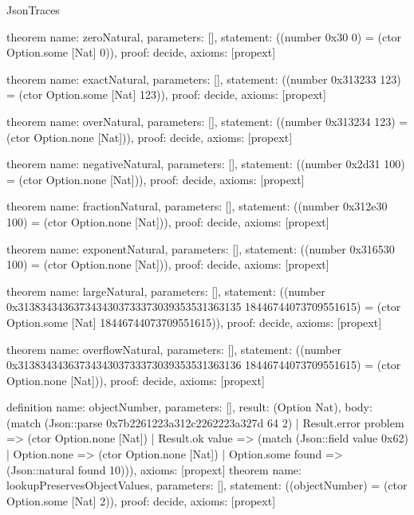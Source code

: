 \begin{lexlean}{JsonTraces}
\begin{semanticmodule}
theorem{
  name: zeroNatural,
  parameters: [],
  statement: ((number 0x30 0) = (ctor Option.some [Nat] 0)),
  proof: decide{},
  axioms: [propext]
}

theorem{
  name: exactNatural,
  parameters: [],
  statement: ((number 0x313233 123) = (ctor Option.some [Nat] 123)),
  proof: decide{},
  axioms: [propext]
}

theorem{
  name: overNatural,
  parameters: [],
  statement: ((number 0x313234 123) = (ctor Option.none [Nat])),
  proof: decide{},
  axioms: [propext]
}

theorem{
  name: negativeNatural,
  parameters: [],
  statement: ((number 0x2d31 100) = (ctor Option.none [Nat])),
  proof: decide{},
  axioms: [propext]
}

theorem{
  name: fractionNatural,
  parameters: [],
  statement: ((number 0x312e30 100) = (ctor Option.none [Nat])),
  proof: decide{},
  axioms: [propext]
}

theorem{
  name: exponentNatural,
  parameters: [],
  statement: ((number 0x316530 100) = (ctor Option.none [Nat])),
  proof: decide{},
  axioms: [propext]
}

theorem{
  name: largeNatural,
  parameters: [],
  statement: ((number 0x3138343436373434303733373039353531363135 18446744073709551615) = (ctor Option.some [Nat] 18446744073709551615)),
  proof: decide{},
  axioms: [propext]
}

theorem{
  name: overflowNatural,
  parameters: [],
  statement: ((number 0x3138343436373434303733373039353531363136 18446744073709551615) = (ctor Option.none [Nat])),
  proof: decide{},
  axioms: [propext]
}

definition{
  name: objectNumber,
  parameters: [],
  result: (Option Nat),
  body: (match (Json::parse 0x7b2261223a312c2262223a327d 64 2) | Result.error problem => (ctor Option.none [Nat]) | Result.ok value => (match (Json::field value 0x62) | Option.none => (ctor Option.none [Nat]) | Option.some found => (Json::natural found 10))),
  axioms: [propext]
}
theorem{
  name: lookupPreservesObjectValues,
  parameters: [],
  statement: ((objectNumber) = (ctor Option.some [Nat] 2)),
  proof: decide{},
  axioms: [propext]
}
\end{semanticmodule}
\end{lexlean}
